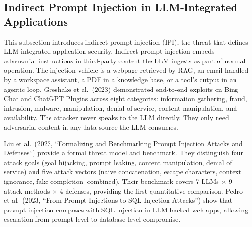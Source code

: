 \documentclass{article}
\begin{document}
\subsection{Indirect Prompt Injection in LLM-Integrated Applications}\label{indirect-prompt-injection-in-llm-integrated-applications}

This subsection introduces indirect prompt injection (IPI), the threat that defines LLM-integrated application security. Indirect prompt injection embeds adversarial instructions in third-party content the LLM ingests as part of normal operation. The injection vehicle is a webpage retrieved by RAG, an email handled by a workspace assistant, a PDF in a knowledge base, or a tool's output in an agentic loop. Greshake et al.~(2023) demonstrated end-to-end exploits on Bing Chat and ChatGPT Plugins across eight categories: information gathering, fraud, intrusion, malware, manipulation, denial of service, content manipulation, and availability. The attacker never speaks to the LLM directly. They only need adversarial content in any data source the LLM consumes.

Liu et al.~(2023, ``Formalizing and Benchmarking Prompt Injection Attacks and Defenses'') provide a formal threat model and benchmark. They distinguish four attack goals (goal hijacking, prompt leaking, content manipulation, denial of service) and five attack vectors (naive concatenation, escape characters, context ignorance, fake completion, combined). Their benchmark covers 7 LLMs × 9 attack methods × 4 defenses, providing the first quantitative comparison. Pedro et al.~(2023, ``From Prompt Injections to SQL Injection Attacks'') show that prompt injection composes with SQL injection in LLM-backed web apps, allowing escalation from prompt-level to database-level compromise.
\end{document}
